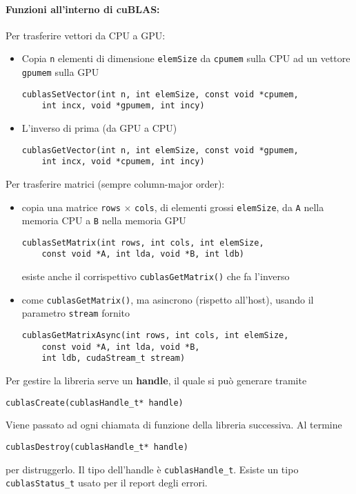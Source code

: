 \paragraph{Funzioni all'interno di cuBLAS:} Per trasferire vettori da CPU a GPU:
\begin{itemize}
	\item Copia \texttt{n} elementi di dimensione \texttt{elemSize} da \texttt{cpumem} sulla CPU ad un vettore \texttt{gpumem} sulla GPU
	\begin{verbatim}
cublasSetVector(int n, int elemSize, const void *cpumem, 
	int incx, void *gpumem, int incy)
	\end{verbatim}
	
	\item L'inverso di prima (da GPU a CPU)
	\begin{verbatim}
cublasGetVector(int n, int elemSize, const void *gpumem, 
	int incx, void *cpumem, int incy)
	\end{verbatim}
\end{itemize}

Per trasferire matrici (sempre column-major order): 
\begin{itemize}
	\item copia una matrice \texttt{rows} $\times$ \texttt{cols}, di elementi grossi \texttt{elemSize}, da \texttt{A} nella memoria CPU a \texttt{B} nella memoria GPU
	\begin{verbatim}
cublasSetMatrix(int rows, int cols, int elemSize, 
	const void *A, int lda, void *B, int ldb)
	\end{verbatim}
	esiste anche il corrispettivo \texttt{cublasGetMatrix()} che fa l'inverso
	
	\item come \texttt{cublasGetMatrix()}, ma asincrono (rispetto all'host), usando il parametro \texttt{stream} fornito
	\begin{verbatim}
cublasGetMatrixAsync(int rows, int cols, int elemSize, 
	const void *A, int lda, void *B, 
	int ldb, cudaStream_t stream)
	\end{verbatim}
\end{itemize}

Per gestire la libreria serve un \textbf{handle}, il quale si può generare tramite
\begin{verbatim}
cublasCreate(cublasHandle_t* handle)
\end{verbatim}

Viene passato ad ogni chiamata di funzione della libreria successiva. Al termine
\begin{verbatim}
cublasDestroy(cublasHandle_t* handle)
\end{verbatim}
per distruggerlo. Il tipo dell'handle è \texttt{cublasHandle\_t}. Esiste un tipo \texttt{cublasStatus\_t} usato per il report degli errori.

